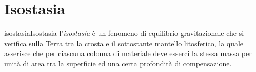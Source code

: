 \documentclass[preview]{standalone}
\begin{document}
\genpage

\section{Isostasia}

\begin{snippetdefinition}{isostasia}{Isostasia}
    l'\textit{isostasia} è un fenomeno di equilibrio gravitazionale
    che si verifica sulla Terra tra la crosta e il sottostante mantello litosferico,
    la quale asserisce che per ciascuna colonna di materiale deve esserci
    la stessa massa per unità di area tra la superficie ed una certa profondità di compensazione.
\end{snippetdefinition}
\end{document}
